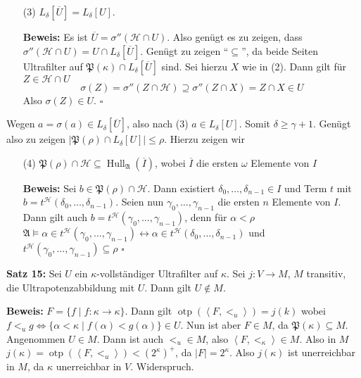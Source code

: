 \documentclass[a4paper,fontsize=11pt]{scrartcl}
\newcommand{\otp}{\operatorname{otp}}
\newcommand{\Hull}{\operatorname{Hull}}
\renewcommand{\bar}[1]{\overline{#1}}
\begin{document}
\begin{itemize}
\begin{itemize}
\begin{itemize}
          \item[(3)] $L_\delta[\bar{U}] = L_\delta[U]$.
          \item[] {\bf Beweis:} Es ist $\bar{U} = \sigma''(\mathcal{H}\cap U)$. Also genügt es zu zeigen, dass $\sigma''(\mathcal{H}\cap U)=U\cap
            L_\delta[\bar{U}]$. Genügt zu zeigen ``$\subseteq$'', da beide Seiten Ultrafilter auf $\mathfrak{P}(\kappa)\cap L_\delta[\bar{U}]$
            sind. Sei hierzu $X$ wie in (2). Dann gilt für $Z\in\mathcal{H}\cap U$
            $$ \sigma(Z) = \sigma''(Z\cap\mathcal{H}) \supseteq \sigma''(Z\cap X) = Z\cap X\in U $$ Also $\sigma(Z)\in U$. \hfill $\square$
        \end{itemize}
        Wegen $a=\sigma(a)\in L_\delta[\bar{U}]$, also nach (3) $a\in L_\delta[U]$. Somit $\delta\ge\gamma+1$. Genügt also zu zeigen
        $|\mathfrak{P}(\rho)\cap L_\delta[U]|\le\rho$. Hierzu zeigen wir
        \begin{itemize}
          \item[(4)] $\mathfrak{P}(\rho)\cap\mathcal{H}\subseteq\Hull_{\mathfrak{A}}(\bar{I})$, wobei $\bar{I}$ die ersten $\omega$ Elemente von $I$
          \item[] {\bf Beweis:} Sei $b\in\mathfrak{P}(\rho)\cap\mathcal{H}$. Dann existiert $\delta_0,\ldots,\delta_{n-1}\in I$ und Term $t$ mit
            $b=t^{\mathcal{H}}(\delta_0,\ldots,\delta_{n-1})$. Seien nun $\gamma_0,\ldots,\gamma_{n-1}$ die ersten $n$ Elemente von $I$. Dann gilt
            auch $b=t^{\mathcal{H}}(\gamma_0,\ldots,\gamma_{n-1})$, denn für $\alpha<\rho$ $\mathfrak{A}\models\alpha\in
            t^{\mathcal{H}}(\gamma_0,\ldots,\gamma_{n-1})\leftrightarrow \alpha\in t^{\mathcal{H}}(\delta_0,\ldots,\delta_{n-1})$ und
            $t^{\mathcal{H}}(\gamma_0,\ldots,\gamma_{n-1})\subseteq\rho$ \hfill $\square$
        \end{itemize}
    \end{itemize}
\end{itemize}

{\bf Satz 15:} Sei $U$ ein $\kappa$-vollständiger Ultrafilter auf $\kappa$. Sei $j:V\rightarrow M$, $M$ transitiv, die Ultrapotenzabbildung mit
$U$. Dann gilt $U\not\in M$.

{\bf Beweis:} $F=\{f\mid f:\kappa\rightarrow\kappa\}$. Dann gilt $\otp(\left<F,<_u\right>)=j(k)$ wobei $f<_u g \Leftrightarrow \{\alpha<\kappa\mid
f(\alpha)< g(\alpha)\}\in U$. Nun ist aber $F\in M$, da $\mathfrak{P}(\kappa)\subseteq M$. Angenommen $U\in M$. Dann ist auch $<_u\in M$, also
$\left<F,<_\kappa\right>\in M$. Also in $M$ $j(\kappa)=\otp(\left<F,<_u\right>)<(2^\kappa)^+$, da $|F|=2^\kappa$. Also $j(\kappa)$ ist unerreichbar in
$M$, da $\kappa$ unerreichbar in $V$. Widerspruch.
\end{document}
